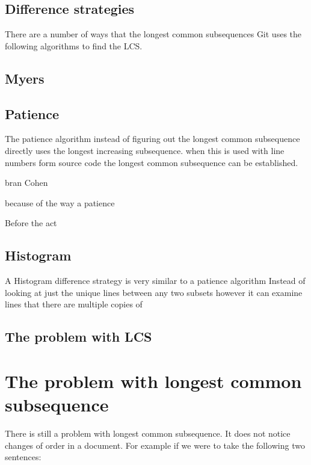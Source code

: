 \subsection{Difference strategies}
There are a number of ways that the longest common subsequences
Git uses the following algorithms to find the LCS.

\subsection{Myers}


\subsection{Patience}
The patience algorithm instead of figuring out the longest common subsequence directly uses the longest increasing subsequence.
when this is used with line numbers form source code the longest common subsequence can be established.

bran Cohen

because of the way a patience 

Before the act

\subsection{Histogram}
A Histogram difference strategy is very similar to a patience algorithm
Instead of looking at just the unique lines between any two subsets however it can examine lines that there are multiple copies of 

\subsection{The problem with LCS}
\section{The problem with longest common subsequence}
There is still a problem with longest common subsequence. It does not notice changes of order in a document.  For example if we were to take the following two sentences:

